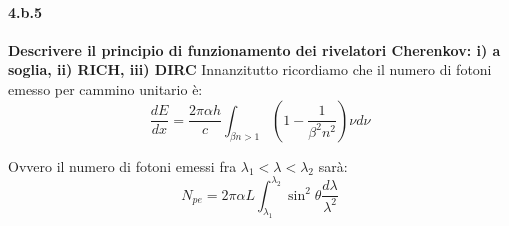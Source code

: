 \documentclass[twoside]{article}
\begin{document}
\paragraph{4.b.5}\textbf{Descrivere il principio di funzionamento dei rivelatori Cherenkov: i) a soglia, ii) RICH, iii) DIRC}
    Innanzitutto ricordiamo che il numero di fotoni emesso per cammino unitario è:
\begin{equation}
\frac{dE}{dx} = \frac{2\pi \alpha h}{c} \int_{\beta n > 1} \left( 1- \frac{1}{\beta^2 n^2} \right) \nu d\nu
\end{equation}

Ovvero il numero di fotoni emessi fra $\lambda_1 < \lambda < \lambda_2$ sarà:
\begin{equation}
N_{pe} = 2 \pi \alpha L \int_{\lambda_1}^{\lambda_2} \sin^2 \theta \frac{d \lambda}{\lambda^2}
\end{equation}
\end{document}
